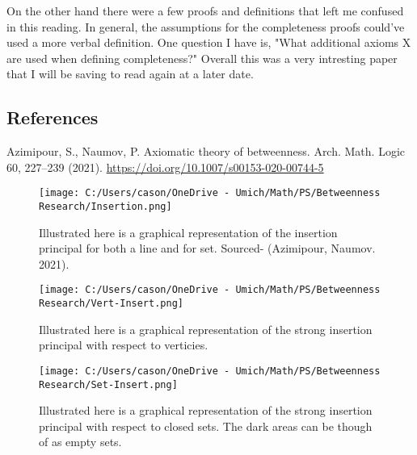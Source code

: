 \documentclass[a4paper,man,natbib]{apa6}
\begin{document}
      On the other hand there were a few proofs and definitions that left me confused in this reading. 
In general, the assumptions for the completeness proofs could've used a more verbal definition. 
One question I have is, "What additional axioms X are used when defining completeness?"
Overall this was a very intresting paper that I will be saving to read again at a later date. 

\newpage
\subsection{References}

      Azimipour, S., Naumov, P. Axiomatic theory of betweenness. Arch. Math. Logic 60, 227–239 (2021). 
\url{https://doi.org/10.1007/s00153-020-00744-5}



\begin{figure}

      \centering
      \texttt{[image: C:/Users/cason/OneDrive - Umich/Math/PS/Betweenness Research/Insertion.png]}
      \caption{\label{C:/Users/cason/OneDrive - Umich/Math/PS/Betweenness Research/Insertion.png}
      Illustrated here is a graphical representation of the insertion principal for both a line and for set. Sourced- (Azimipour, Naumov. 2021).}

\end{figure}

\begin{figure}

      \centering
      \texttt{[image: C:/Users/cason/OneDrive - Umich/Math/PS/Betweenness Research/Vert-Insert.png]}
      \caption{\label{C:/Users/cason/OneDrive - Umich/Math/PS/Betweenness Research/Vert-Insert.png}
      Illustrated here is a graphical representation of the strong insertion principal with respect to verticies.}

\end{figure}

\begin{figure}

      \centering
      \texttt{[image: C:/Users/cason/OneDrive - Umich/Math/PS/Betweenness Research/Set-Insert.png]}
      \caption{\label{C:/Users/cason/OneDrive - Umich/Math/PS/Betweenness Research/Set-Insert.png}
      Illustrated here is a graphical representation of the strong insertion principal with respect to closed sets. The dark areas can be though of as empty sets.}

\end{figure}
\end{document}
